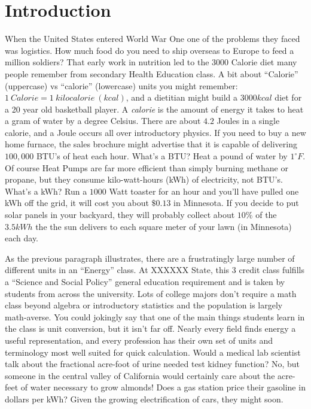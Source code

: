 \documentclass[prb,preprint]{revtex4-2}
\begin{document}
\section{Introduction}
When the United States entered World War One one of the problems they faced was logistics.  How much food do you need to ship overseas to Europe to feed a million soldiers?  That early work in nutrition led to the $3000$ Calorie diet many people remember from secondary Health Education class.  A bit about ``Calorie'' (uppercase) vs ``calorie'' (lowercase) units you might remember: $1~Calorie = 1~kilocalorie~(kcal)$, and a dietitian might build a $3000 kcal$ diet for a 20 year old basketball player.  A \textit{calorie} is the amount of energy it takes  to heat a gram of water by a degree Celsius.  There are about $4.2$ Joules in a single calorie, and a Joule occurs all over introductory  physics.  If you need to buy a new home furnace, the sales brochure might advertise that it is capable of delivering $100,000$ BTU's of heat each hour.  What's a BTU? Heat a pound of water by $1^{\circ}F$.  Of course Heat Pumps are far more efficient than simply burning methane or propane, but they consume kilo-watt-hours (kWh) of electricity, not BTU's.  What's a kWh?  Run a $1000$ Watt toaster for an hour and you'll have pulled one kWh off the grid, it will cost you about $\$0.13$ in Minnesota.  If you decide to put solar panels in your backyard, they will probably collect about $10\%$ of the $3.5kWh$ the  the sun delivers to each square meter of your lawn (in Minnesota) each day.  

As the previous paragraph illustrates, there are a frustratingly large number of different units in an ``Energy'' class.  At 
XXXXXX
State, this 3 credit class fulfills a ``Science and Social Policy'' general education requirement and is taken by students from across the university.   Lots of college majors don't require a math class beyond algebra or introductory statistics and the population is largely math-averse. You could jokingly say that one of the main things students learn in the class is unit conversion, but it isn't far off.  Nearly every field finds energy a useful representation, and every profession has their own set of units and terminology most well suited for quick calculation.  Would a medical lab scientist talk about the fractional acre-foot of urine needed test kidney function?  No, but someone in the central valley of California would certainly care about the acre-feet of water necessary to grow almonds!  Does a gas station price their gasoline in dollars per kWh? Given the growing electrification of cars, they might soon.
\end{document}
